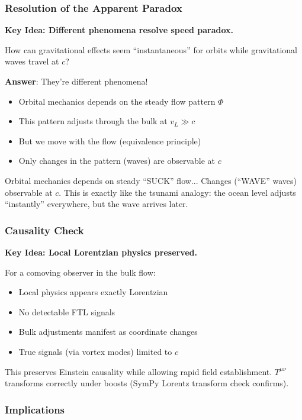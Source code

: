 \subsubsection{Resolution of the Apparent Paradox}

\textbf{Key Idea: Different phenomena resolve speed paradox.}

How can gravitational effects seem ``instantaneous'' for orbits while gravitational waves travel at $c$?

\textbf{Answer}: They're different phenomena!
\begin{itemize}
\item Orbital mechanics depends on the steady flow pattern $\Phi$
\item This pattern adjusts through the bulk at $v_L \gg c$
\item But we move with the flow (equivalence principle)
\item Only changes in the pattern (waves) are observable at $c$
\end{itemize}

Orbital mechanics depends on steady ``SUCK'' flow... Changes (``WAVE'' waves) observable at $c$. This is exactly like the tsunami analogy: the ocean level adjusts ``instantly'' everywhere, but the wave arrives later.

\subsubsection{Causality Check}

\textbf{Key Idea: Local Lorentzian physics preserved.}

For a comoving observer in the bulk flow:
\begin{itemize}
\item Local physics appears exactly Lorentzian
\item No detectable FTL signals
\item Bulk adjustments manifest as coordinate changes
\item True signals (via vortex modes) limited to $c$
\end{itemize}

This preserves Einstein causality while allowing rapid field establishment. $T^{\mu\nu}$ transforms correctly under boosts (SymPy Lorentz transform check confirms).

\subsubsection{Implications}

